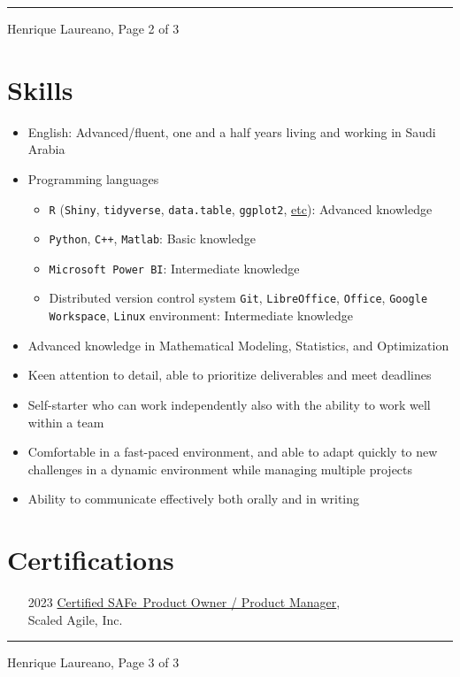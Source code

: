 \documentclass[12pt]{article}
\newcommand{\horrule}[1]{\noindent\rule{\linewidth}{#1}}
\begin{document}
\vspace{\fill}
\horrule{1pt}
\noindent Henrique Laureano, \hfill Page 2 of 3

\section*{Skills}

\begin{itemize}
 \item English: Advanced/fluent, one and a half years living and working
       in Saudi Arabia
 \item Programming languages
  \begin{itemize}
   \item \texttt{R} (\texttt{Shiny}, \texttt{tidyverse},
     \texttt{data.table}, \texttt{ggplot2},
     \href{https://henriquelaureano.github.io/visualizations/}{\color{blue}etc}):
         Advanced knowledge
   \item \texttt{Python}, \texttt{C++}, \texttt{Matlab}: Basic knowledge
   \item \texttt{Microsoft Power BI}: Intermediate knowledge 
   \item Distributed version control system \texttt{Git},
         \texttt{LibreOffice}, \texttt{Office},
         \texttt{Google Workspace}, \texttt{Linux} environment:
         Intermediate knowledge
  \end{itemize}
 \item Advanced knowledge in Mathematical Modeling, Statistics, and
       Optimization
 \item Keen attention to detail, able to prioritize deliverables and meet deadlines
 \item Self-starter who can work independently also with the ability to work well
       within a team
 \item Comfortable in a fast-paced environment, and able to adapt quickly to new
       challenges in a dynamic environment while managing multiple projects
 \item Ability to communicate effectively both orally and in writing
\end{itemize}

\section*{Certifications}

\begin{itemize}
 \item[2023] \href{https://www.credly.com/badges/14777d32-2f4f-43b9-bbff-4f414779f485/linked_in?t=rxek5i}{\color{blue}Certified SAFe\textregistered~Product Owner / Product Manager},\\
             Scaled Agile, Inc.
 
\end{itemize}

\vspace{\fill}
\horrule{1pt}
\noindent Henrique Laureano, \hfill Page 3 of 3
\end{document}

